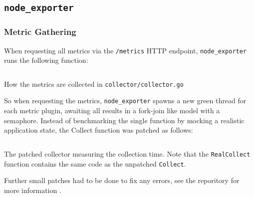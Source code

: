 \subsection{\texttt{node\_exporter}}
\subsubsection{Metric Gathering}

When requesting all metrics via the \texttt{/metrics} HTTP endpoint, \texttt{node\_exporter} runs the following
function:

\begin{listing}[H]
  \inputminted{go}{./gather.go}
  \caption{How the metrics are collected in \texttt{collector/collector.go}}
\end{listing}

So when requesting the metrics, \texttt{node\_exporter} spawns a new green thread for each metric plugin, 
awaiting all results in a fork-join like model with a semaphore. Instead of benchmarking the single function
by mocking a realistic application state, the Collect function was patched as follows:

\begin{listing}[H]
  \inputminted{go}{./gather_patched.go}
  \caption{The patched collector measuring the collection time. Note that the \texttt{RealCollect} function contains the same code as the unpatched \texttt{Collect}.}
\end{listing}

Further small patches had to be done to fix any errors, see the reporitory for more information \cite{my_node_exporter}.

